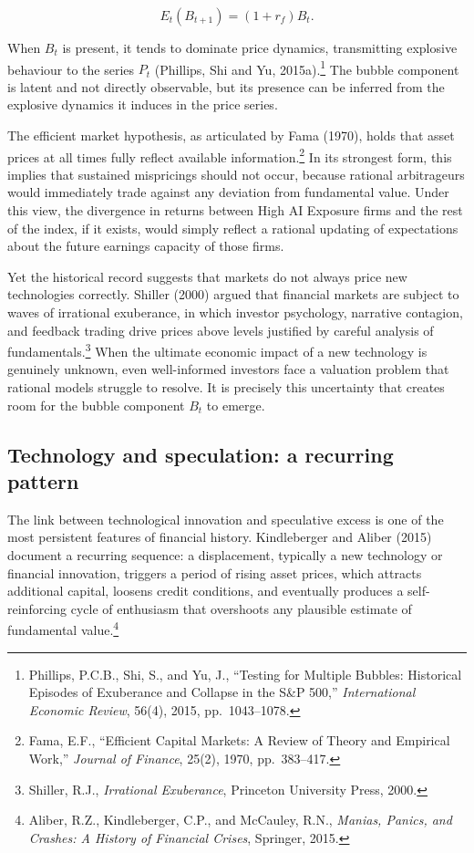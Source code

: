\documentclass[12pt,a4paper]{article}
\begin{document}
\begin{equation}
E_t(B_{t+1}) = (1 + r_f) B_t.
\end{equation}

\noindent When $B_t$ is present, it tends to dominate price dynamics, transmitting explosive behaviour to the series $P_t$ (Phillips, Shi and Yu, 2015a).\footnote{Phillips, P.C.B., Shi, S., and Yu, J., ``Testing for Multiple Bubbles: Historical Episodes of Exuberance and Collapse in the S\&P 500,'' \textit{International Economic Review}, 56(4), 2015, pp.\ 1043--1078.} The bubble component is latent and not directly observable, but its presence can be inferred from the explosive dynamics it induces in the price series.

The efficient market hypothesis, as articulated by Fama (1970), holds that asset prices at all times fully reflect available information.\footnote{Fama, E.F., ``Efficient Capital Markets: A Review of Theory and Empirical Work,'' \textit{Journal of Finance}, 25(2), 1970, pp.\ 383--417.} In its strongest form, this implies that sustained mispricings should not occur, because rational arbitrageurs would immediately trade against any deviation from fundamental value. Under this view, the divergence in returns between High AI Exposure firms and the rest of the index, if it exists, would simply reflect a rational updating of expectations about the future earnings capacity of those firms.

Yet the historical record suggests that markets do not always price new technologies correctly. Shiller (2000) argued that financial markets are subject to waves of irrational exuberance, in which investor psychology, narrative contagion, and feedback trading drive prices above levels justified by careful analysis of fundamentals.\footnote{Shiller, R.J., \textit{Irrational Exuberance}, Princeton University Press, 2000.} When the ultimate economic impact of a new technology is genuinely unknown, even well-informed investors face a valuation problem that rational models struggle to resolve. It is precisely this uncertainty that creates room for the bubble component $B_t$ to emerge.

\subsection{Technology and speculation: a recurring pattern}

The link between technological innovation and speculative excess is one of the most persistent features of financial history. Kindleberger and Aliber (2015) document a recurring sequence: a displacement, typically a new technology or financial innovation, triggers a period of rising asset prices, which attracts additional capital, loosens credit conditions, and eventually produces a self-reinforcing cycle of enthusiasm that overshoots any plausible estimate of fundamental value.\footnote{Aliber, R.Z., Kindleberger, C.P., and McCauley, R.N., \textit{Manias, Panics, and Crashes: A History of Financial Crises}, Springer, 2015.}
\end{document}
